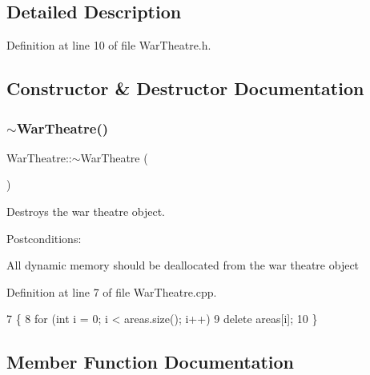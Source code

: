 \subsection{Detailed Description}


Definition at line 10 of file War\+Theatre.\+h.



\subsection{Constructor \& Destructor Documentation}
\mbox{\label{classWarTheatre_a28324e2234a88933e1697c0f7f9ff222}} 
\subsubsection{\texorpdfstring{$\sim$\+War\+Theatre()}{~WarTheatre()}}
{\footnotesize\ttfamily War\+Theatre\+::$\sim$\+War\+Theatre (\begin{DoxyParamCaption}{ }\end{DoxyParamCaption})}



Destroys the war theatre object. 

Postconditions\+:
\begin{DoxyItemize}
\item All dynamic memory should be deallocated from the war theatre object 
\end{DoxyItemize}

Definition at line 7 of file War\+Theatre.\+cpp.


\begin{DoxyCode}
7                         \{
8     \textcolor{keywordflow}{for} (\textcolor{keywordtype}{int} i = 0; i < areas.size(); i++)
9         \textcolor{keyword}{delete} areas[i];
10 \}
\end{DoxyCode}


\subsection{Member Function Documentation}
\mbox{\label{classWarTheatre_adc871336a6bf1263216b0f87da04cc57}} 

